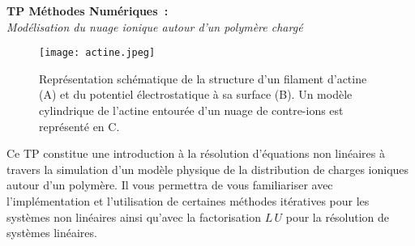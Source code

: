 \documentclass[a4paper,10pt]{article}
\begin{document}
 \begin{center}
  \begin{LARGE}
  \textbf{TP M\'ethodes Num\'eriques~:}\\
  \textit{Mod\'elisation du nuage ionique autour d'un polym\`ere charg\'e}
  \end{LARGE}
 \end{center}
 
\begin{figure}[h]
\begin{center}
\texttt{[image: actine.jpeg]}
\caption{
Repr\'esentation sch\'ematique de la structure d'un filament d'actine (A) et du potentiel 
\'electrostatique \`a sa surface (B). Un mod\`ele cylindrique de l'actine entour\'ee d'un nuage de
contre-ions est repr\'esent\'e en C.}
\label{actine}
\end{center}

\end{figure} 

Ce TP constitue une introduction \`a la r\'esolution d'\'equations non lin\'eaires
\`a travers la simulation d'un mod\`ele physique 
de la distribution de charges ioniques autour d'un polym\`ere. 
Il vous permettra de vous familiariser avec l'impl\'ementation et l'utilisation de certaines m\'ethodes
it\'eratives pour les syst\`emes non lin\'eaires
ainsi qu'avec la factorisation $L\, U$
pour la r\'esolution de syst\`emes lin\'eaires.
 
\end{document}
